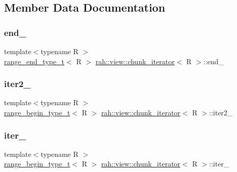 \subsection{Member Data Documentation}
\mbox{\label{structrah_1_1view_1_1chunk__iterator_a2963715961aa3672715ed62ada056341}} 
\subsubsection{\texorpdfstring{end\_}{end\_}}
{\footnotesize\ttfamily template$<$typename R $>$ \\
\mbox{\hyperlink{namespacerah_a9657e24ae477f4482225b133fe286b65}{range\+\_\+end\+\_\+type\+\_\+t}}$<$ R $>$ \mbox{\hyperlink{structrah_1_1view_1_1chunk__iterator}{rah\+::view\+::chunk\+\_\+iterator}}$<$ R $>$\+::end\+\_\+}

\mbox{\label{structrah_1_1view_1_1chunk__iterator_a000b88a481b2b524f909e6ed7fd35107}} 
\subsubsection{\texorpdfstring{iter2\_}{iter2\_}}
{\footnotesize\ttfamily template$<$typename R $>$ \\
\mbox{\hyperlink{namespacerah_a28aff4eeddcece6be65ff0b956d32d4a}{range\+\_\+begin\+\_\+type\+\_\+t}}$<$ R $>$ \mbox{\hyperlink{structrah_1_1view_1_1chunk__iterator}{rah\+::view\+::chunk\+\_\+iterator}}$<$ R $>$\+::iter2\+\_\+}

\mbox{\label{structrah_1_1view_1_1chunk__iterator_aa160e89fb5e1029273ce017baf052f2b}} 
\subsubsection{\texorpdfstring{iter\_}{iter\_}}
{\footnotesize\ttfamily template$<$typename R $>$ \\
\mbox{\hyperlink{namespacerah_a28aff4eeddcece6be65ff0b956d32d4a}{range\+\_\+begin\+\_\+type\+\_\+t}}$<$ R $>$ \mbox{\hyperlink{structrah_1_1view_1_1chunk__iterator}{rah\+::view\+::chunk\+\_\+iterator}}$<$ R $>$\+::iter\+\_\+}


